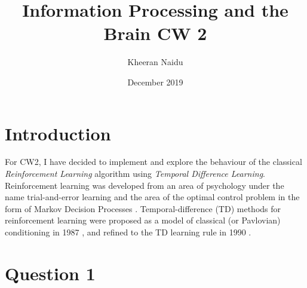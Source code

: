 \documentclass[10pt, a4paper]{article}
\title{Information Processing and the Brain CW 2}
\author{Kheeran Naidu}
\date{December 2019}
\begin{document}
\maketitle

\section*{Introduction}
For CW2, I have decided to implement and explore the behaviour of the classical \textit{Reinforcement Learning} algorithm using \textit{Temporal Difference Learning}. Reinforcement learning was developed from an area of psychology under the name trial-and-error learning \cite{woodworth1937experimental} and the area of the optimal control problem in the form of Markov Decision Processes \cite{bellman1957dynamic} \cite{bellman1957markov}. Temporal-difference (TD) methods for reinforcement learning were proposed as a model of classical (or Pavlovian) conditioning in 1987 \cite{sutton1987temporal}, and refined to the TD learning rule in 1990 \cite{sutton1990time}.

\section*{Question 1}

\newpage

\printbibliography
\end{document}
